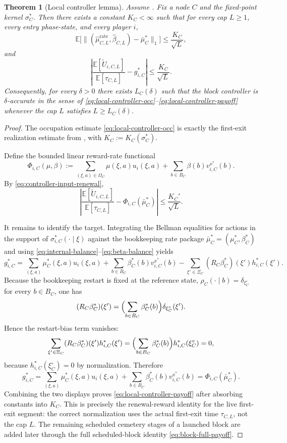 \documentclass[12pt]{article}
\newtheorem{theorem}{Theorem}[section]
\theoremstyle{definition}
\newcommand{\E}{\mathbb{E}}
\newcommand{\1}{\mathbf{1}}
\begin{document}
\begin{theorem}[Local controller lemma]

\label{thm:local-controller}
Assume . Fix a node $C$ and the fixed-point kernel
$\sigma_C^*$. Then there exists a constant $K_C<\infty$ such that for every cap
$L\ge 1$, every entry phase-state, and every player $i$,
\begin{equation}
\label{eq:local-controller-occ}
\E\bigl[\|(\widehat\mu_{C,L}^{\mathrm{rate}},\widehat\beta_{C,L})-\bar\mu_C^*\|_1\bigr]
\le \frac{K_C}{\sqrt L},
\end{equation}
and
\begin{equation}
\label{eq:local-controller-payoff}
\left|
\frac{\E[\widetilde U_{i,C,L}]}{\E[\tau_{C,L}]}
-
g_{i,C}^*
\right|
\le \frac{K_C}{\sqrt L}.
\end{equation}
Consequently, for every $\delta>0$ there exists $L_C(\delta)$ such that the block
controller is $\delta$-accurate in the sense of
\eqref{eq:local-controller-occ}--\eqref{eq:local-controller-payoff} whenever the
cap $L$ satisfies $L\ge L_C(\delta)$.
\end{theorem}

\begin{proof}
The occupation estimate \eqref{eq:local-controller-occ} is exactly the first-exit
realization estimate from , with
$K_C:=K_C(\sigma_C^*)$.

Define the bounded linear reward-rate functional
\[
\Phi_{i,C}(\mu,\beta)
:=
\sum_{(\xi,a)\in\Omega_C}\mu(\xi,a)u_i(\xi,a)
+
\sum_{b\in B_C}\beta(b)v_{i,C}^{x^*}(b).
\]
By \eqref{eq:controller-input-renewal},
\[
\left|
\frac{\E[\widetilde U_{i,C,L}]}{\E[\tau_{C,L}]}
-
\Phi_{i,C}(\bar\mu_C^*)
\right|
\le \frac{K_C'}{\sqrt L}.
\]

It remains to identify the target. Integrating the Bellman equalities for actions
in the support of $\sigma_{i,C}^*(\cdot\mid\xi)$ against the bookkeeping rate
package $\bar\mu_C^*=(\mu_C^*,\beta_C^*)$ and using
\eqref{eq:internal-balance}--\eqref{eq:beta-balance} yields
\[
g_{i,C}^*
=
\sum_{(\xi,a)}\mu_C^*(\xi,a)u_i(\xi,a)
+
\sum_{b\in B_C}\beta_C^*(b)v_{i,C}^{x^*}(b)
-
\sum_{\xi'\in\Xi_C}(R_C\beta_C^*)(\xi')h_{i,C}^*(\xi').
\]
Because the bookkeeping restart is fixed at the reference state,
$\rho_C(\cdot\mid b)=\delta_{\xi_C^\circ}$ for every $b\in B_C$, one has
\[
(R_C\beta_C^*)(\xi')
=
\Bigl(\sum_{b\in B_C}\beta_C^*(b)\Bigr)\delta_{\xi_C^\circ}(\xi').
\]
Hence the restart-bias term vanishes:
\[
\sum_{\xi'\in\Xi_C}(R_C\beta_C^*)(\xi')h_{i,C}^*(\xi')
=
\Bigl(\sum_{b\in B_C}\beta_C^*(b)\Bigr)h_{i,C}^*(\xi_C^\circ)
=
0,
\]
because $h_{i,C}^*(\xi_C^\circ)=0$ by normalization. Therefore
\[
g_{i,C}^*
=
\sum_{(\xi,a)}\mu_C^*(\xi,a)u_i(\xi,a)
+
\sum_{b\in B_C}\beta_C^*(b)v_{i,C}^{x^*}(b)
=
\Phi_{i,C}(\bar\mu_C^*).
\]
Combining the two displays proves \eqref{eq:local-controller-payoff} after
absorbing constants into $K_C$. This is precisely the renewal-reward identity for
the live first-exit segment: the correct normalization uses the actual first-exit
time $\tau_{C,L}$, not the cap $L$. The remaining scheduled cemetery stages of a
launched block are added later through the full scheduled-block identity
\eqref{eq:block-full-payoff}.
\end{proof}
\end{document}
